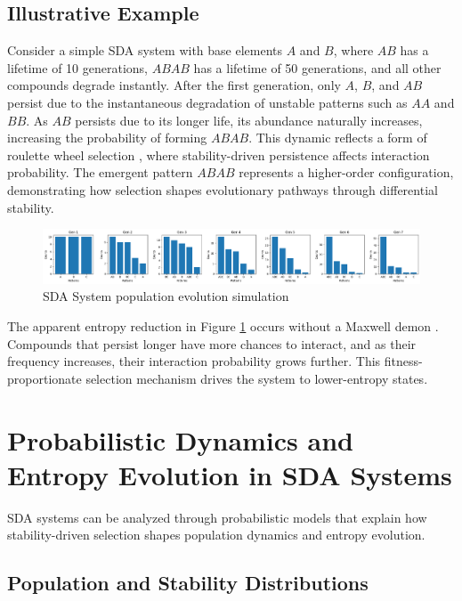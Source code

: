 \documentclass[preprint,12pt]{elsarticle}
\begin{document}
\subsection{Illustrative Example}

Consider a simple SDA system with base elements \( A \) and \( B \), where \( AB \) has a lifetime of 10 generations, \( ABAB \) has a lifetime of 50 generations, and all other compounds degrade instantly. After the first generation, only \( A \), \( B \), and \( AB \) persist due to the instantaneous degradation of unstable patterns such as \( AA \) and \( BB \). As \( AB \) persists due to its longer life, its abundance naturally increases, increasing the probability of forming \( ABAB \). This dynamic reflects a form of roulette wheel selection \cite{goldberg1989genetic, holland1975adaptation}, where stability-driven persistence affects interaction probability. The emergent pattern \( ABAB \) represents a higher-order configuration, demonstrating how selection shapes evolutionary pathways through differential stability.

\begin{figure}[htp]
    \centering
    \includegraphics[width=1\textwidth]{figure_2}
    \caption{SDA System population evolution simulation}
    \label{fig:figure_2}
\end{figure}

The apparent entropy reduction in Figure \ref{fig:figure_2} occurs without a Maxwell demon \cite{leff2002maxwell}. Compounds that persist longer have more chances to interact, and as their frequency increases, their interaction probability grows further. This fitness-proportionate selection mechanism \cite{back1996evolutionary, goldberg1989genetic, holland1975adaptation} drives the system to lower-entropy states.

\section{Probabilistic Dynamics and Entropy Evolution in SDA Systems}

SDA systems can be analyzed through probabilistic models that explain how stability-driven selection shapes population dynamics and entropy evolution.

\subsection{Population and Stability Distributions}
\end{document}
